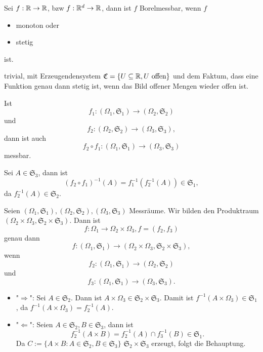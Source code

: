 			\begin{satz}
				Sei $f:\mathbb{R}\to\mathbb{R}$, bzw $f:\mathbb{R}^d\to\mathbb{R}$, dann ist $f$ Borelmessbar, wenn $f$
				 \begin{itemize}
				 	\item monoton oder
				 	\item stetig
				 \end{itemize}
				 ist. 
			\end{satz}
			
			\begin{bew}
				trivial, mit Erzeugendensystem $\mathfrak{C}=\{U\subseteq \mathbb{R}, U\text{ offen}\}$ und dem Faktum, dass eine Funktion genau dann stetig ist, wenn das Bild offener Mengen wieder offen ist. 
			\end{bew}
			
			\begin{satz}
				Ist 
				\[ f_1:(\Omega_1,\mathfrak{S}_1)\to(\Omega_2,\mathfrak{S}_2) \]
				und
				\[ f_2:(\Omega_2,\mathfrak{S}_2)\to(\Omega_3,\mathfrak{S}_3), \]
				dann ist auch
				\[ f_2\circ f_1:(\Omega_1,\mathfrak{S}_1)\to(\Omega_3,\mathfrak{S}_3) \]
				messbar. 
			\end{satz}
			
			\begin{bew}
				Sei $A\in\mathfrak{S}_3$, dann ist
				\[ (f_2\circ f_1)^{-1}(A)=f_1^{-1}(f_2^{-1}(A))\in\mathfrak{S}_1, \]
				da $f_2^{-1}(A)\in\mathfrak{S}_2$. \arge
			\end{bew}
			
			\begin{satz}
				Seien $(\Omega_1,\mathfrak{S}_1),(\Omega_2,\mathfrak{S}_2),(\Omega_3,\mathfrak{S}_3)$ Messräume. Wir bilden den Produktraum $(\Omega_2\times\Omega_3, \mathfrak{S}_2\times\mathfrak{S}_3)$. Dann ist
				\[ f:\Omega_1\to\Omega_2\times\Omega_3, f=(f_2,f_3) \]
				genau dann
				\[ f:(\Omega_1,\mathfrak{S}_1)\to (\Omega_2\times\Omega_3, \mathfrak{S}_2\times\mathfrak{S}_3), \]
				wenn
				\[ f_2:(\Omega_1,\mathfrak{S}_1)\to (\Omega_2,\mathfrak{S}_2) \]
				und
				\[ f_3:(\Omega_1,\mathfrak{S}_1)\to(\Omega_3,\mathfrak{S}_3). \]
			\end{satz}
			
			\begin{bew}
				\begin{itemize}
					\item "$\Rightarrow$":\newline
					Sei $A\in\mathfrak{S}_2$. Dann ist $A\times\Omega_3\in\mathfrak{S}_2\times\mathfrak{S}_3$. Damit ist $f^{-1}(A\times\Omega_3)\in\mathfrak{S}_1$, da $f^{-1}(A\times\Omega_3)=f_2^{-1}(A)$. 
					
					\item "$\Leftarrow$":\newline
					Seien $A\in\mathfrak{S}_2, B\in\mathfrak{S}_3$, dann ist
					\[ f_2^{-1}(A\times B)=f_2^{-1}(A)\cap f_3^{-1}(B)\in\mathfrak{S}_1. \]
					Da $C:=\{A\times B: A\in\mathfrak{S}_2, B\in\mathfrak{S}_3\}$ $\mathfrak{S}_2\times\mathfrak{S}_3$ erzeugt, folgt die Behauptung. 
				\end{itemize}
				\arge
			\end{bew}
			
